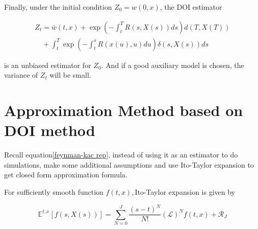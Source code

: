 Finally, under the initial condition $Z_0 = w(0,x)$, the DOI estimator

\begin{equation}
    \begin{gathered}
        Z_t =\bar{w}(t, x)+\exp \left(-\int_{t}^{T} R(s,X(s)) d s\right) d(T,X(T)) \\
        \quad+\int_{t}^{T} \exp \left(-\int_{t}^{s} R(x(u), u) d u\right) \delta(s,X(s))d s
        \end{gathered}
\end{equation}

\noindent is an unbiased estimator for $Z_0$. And if a good auxiliary model is chosen,  the variance of $Z_t$ will be small.








\section{Approximation Method based on DOI method}
\label{sec: 2.2}

Recall equation\eqref{feynman-kac rep}, instead of using it as an estimator to do simulations, \cite{kristensen_adding_2011} make some additional assumptions and use Ito-Taylor expansion to get closed form approximation formula.

For sufficiently smooth function $f(t,x), $Ito-Taylor expansion is given by

\begin{equation}
    \mathbb{E}^{t, x}[f(s, X(s))]=\sum_{N=0}^{J} \frac{(s-t)^{N}}{N !}\left(\mathcal{L}\right)^{N} f(t, x)+\mathcal{R}_{J}
\end{equation}

